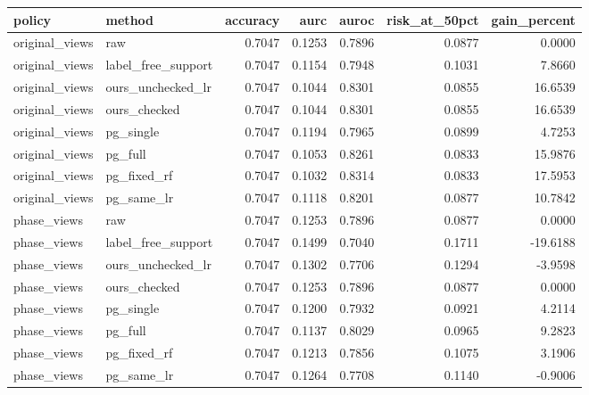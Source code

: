 \begin{tabular}{llrrrrr}
\hline
policy & method & accuracy & aurc & auroc & risk\_at\_50pct & gain\_percent \\
\hline
original\_views & raw & 0.7047 & 0.1253 & 0.7896 & 0.0877 & 0.0000 \\
original\_views & label\_free\_support & 0.7047 & 0.1154 & 0.7948 & 0.1031 & 7.8660 \\
original\_views & ours\_unchecked\_lr & 0.7047 & 0.1044 & 0.8301 & 0.0855 & 16.6539 \\
original\_views & ours\_checked & 0.7047 & 0.1044 & 0.8301 & 0.0855 & 16.6539 \\
original\_views & pg\_single & 0.7047 & 0.1194 & 0.7965 & 0.0899 & 4.7253 \\
original\_views & pg\_full & 0.7047 & 0.1053 & 0.8261 & 0.0833 & 15.9876 \\
original\_views & pg\_fixed\_rf & 0.7047 & 0.1032 & 0.8314 & 0.0833 & 17.5953 \\
original\_views & pg\_same\_lr & 0.7047 & 0.1118 & 0.8201 & 0.0877 & 10.7842 \\
phase\_views & raw & 0.7047 & 0.1253 & 0.7896 & 0.0877 & 0.0000 \\
phase\_views & label\_free\_support & 0.7047 & 0.1499 & 0.7040 & 0.1711 & -19.6188 \\
phase\_views & ours\_unchecked\_lr & 0.7047 & 0.1302 & 0.7706 & 0.1294 & -3.9598 \\
phase\_views & ours\_checked & 0.7047 & 0.1253 & 0.7896 & 0.0877 & 0.0000 \\
phase\_views & pg\_single & 0.7047 & 0.1200 & 0.7932 & 0.0921 & 4.2114 \\
phase\_views & pg\_full & 0.7047 & 0.1137 & 0.8029 & 0.0965 & 9.2823 \\
phase\_views & pg\_fixed\_rf & 0.7047 & 0.1213 & 0.7856 & 0.1075 & 3.1906 \\
phase\_views & pg\_same\_lr & 0.7047 & 0.1264 & 0.7708 & 0.1140 & -0.9006 \\
\hline
\end{tabular}

